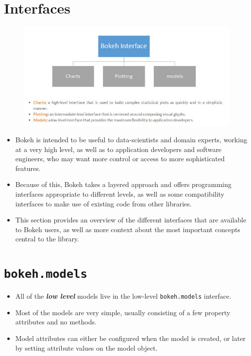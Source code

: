 \documentclass[a4paper,12pt]{article}
\begin{document}
\section*{Interfaces}
\begin{figure}[h!]
	\centering
	\includegraphics[width=1.1\linewidth]{images/00-Interfaces}
\end{figure}
\begin{itemize}
\item Bokeh is intended to be useful to data-scientists and domain experts, working at a very high level, as well as to application developers and software engineers, who may want more control or access to more sophisticated features. 
\item Because of this, Bokeh takes a layered approach and offers programming interfaces appropriate to different levels, as well as some compatibility interfaces to make use of existing code from other libraries. 

\item This section provides an overview of the different interfaces that are available to Bokeh users, as well as more context about the most important concepts central to the library. 
\end{itemize}



\newpage

\section*{\texttt{bokeh.models}}

\begin{itemize}
\item All of the \textbf{\textit{low level}} models live in the low-level \texttt{bokeh.models} interface. \item Most of the models are very simple, usually consisting of a few property attributes and no methods. 
\item Model attributes can either be configured when the model is created, or later by setting attribute values on the model object. 

\end{itemize}
\end{document}

